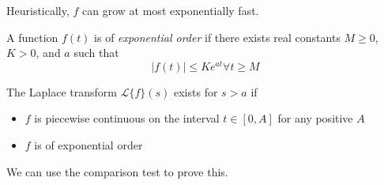 \documentclass[12pt]{article}
\begin{document}
Heuristically, $f$ can grow at most exponentially fast.

\begin{defn}
	A function $f(t)$ is of \emph{exponential order} if there exists real constants $M\geq0$, $K>0$, and $a$ such that
	$$|f(t)| \leq Ke^{at} \forall t \geq M$$
\end{defn}

\begin{thm}
	The Laplace transform $\mathcal{L}\{f\}(s)$ exists for $s>a$ if
	\begin{itemize}
		\item $f$ is piecewise continuous on the interval $t \in [0,A]$ for any positive $A$
		\item $f$ is of exponential order
	\end{itemize}
\end{thm}

We can use the comparison test to prove this.
\end{document}
